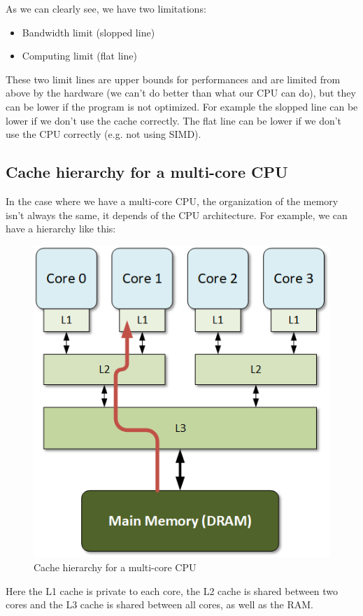 \documentclass[12pt, openany]{report}
\theoremstyle{definition}
\begin{document}
As we can clearly see, we have two limitations:
\begin{itemize}
	\item Bandwidth limit (slopped line)
	\item Computing limit (flat line)
\end{itemize}
These two limit lines are upper bounds for performances and are limited from above by the hardware (we can't do better than what our CPU can do), but they can be lower if the program is not optimized. For example the slopped line can be lower if we don't use the cache correctly. The flat line can be lower if we don't use the CPU correctly (e.g. not using SIMD).\\
\newpage
\subsection{Cache hierarchy for a multi-core CPU}
In the case where we have a multi-core CPU, the organization of the memory isn't always the same, it depends of the CPU architecture. For example, we can have a hierarchy like this:
\begin{figure}[H]
	\centering
	\includegraphics[scale=0.5]{img/multicore-cache.png}
	\caption{Cache hierarchy for a multi-core CPU}
	\label{fig:multi_core_cache}
\end{figure}
Here the L1 cache is private to each core, the L2 cache is shared between two cores and the L3 cache is shared between all cores, as well as the RAM. 
\end{document}
